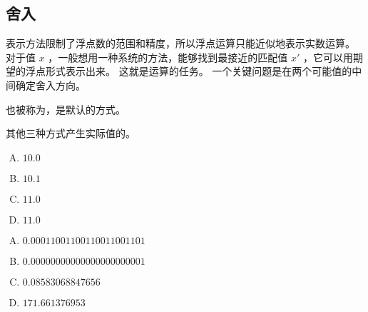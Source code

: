 {    \subsection{舍入}
    {
        表示方法限制了浮点数的范围和精度，所以浮点运算只能近似地表示实数运算。
        对于值 $x$ ，一般想用一种系统的方法，能够找到最接近的匹配值 $x'$ ，它可以用期望的浮点形式表示出来。
        这就是运算的任务。
        一个关键问题是在两个可能值的中间确定舍入方向。

        也被称为，是默认的方式。

        其他三种方式产生实际值的。

        \begin{practicec}
            \begin{enumerate}[A.]
                \item $10.0$
                \item $10.1$
                \item $11.0$
                \item $11.0$
            \end{enumerate}
        \end{practicec}

        \begin{practicec}
            \begin{enumerate}[A.]
                \item $0.00011001100110011001101$
                \item $0.00000000000000000000001$
                \item $0.08583068847656$
                \item $171.661376953$
            \end{enumerate}
        \end{practicec}

}}

